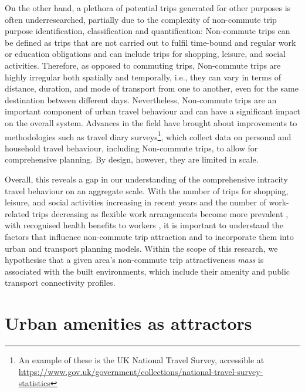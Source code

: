 On the other hand, a plethora of potential trips generated for other purposes is often underresearched, partially due to the complexity of non-commute trip purpose identification, classification and quantification: Non-commute trips can be defined as trips that are not carried out to fulfil time-bound and regular work or education obligations and can include trips for shopping, leisure, and social activities. Therefore, as opposed to commuting trips, Non-commute trips are highly irregular both spatially and temporally, i.e., they can vary in terms of distance, duration, and mode of transport from one to another, even for the same destination between different days. Nevertheless, Non-commute trips are an important component of urban travel behaviour and can have a significant impact on the overall system. Advances in the field have brought about improvements to methodologies such as travel diary surveys\footnote{An example of these is the UK National Travel Survey, accessible at \url{https://www.gov.uk/government/collections/national-travel-survey-statistics}}, which collect data on personal and household travel behaviour, including Non-commute trips, to allow for comprehensive planning. By design, however, they are limited in scale.

Overall, this reveals a gap in our understanding of the comprehensive intracity travel behaviour on an aggregate scale. With the number of trips for shopping, leisure, and social activities increasing in recent years and the number of work-related trips decreasing as flexible work arrangements become more prevalent \citep{wohnerWorkFlexiblyTravel2022}, with recognised health benefits to workers \citep{macleodCommutingWorkPostpandemic2022}, it is important to understand the factors that influence non-commute trip attraction and to incorporate them into urban and transport planning models. Within the scope of this research, we hypothesise that a given area's non-commute trip attractiveness \textit{mass} is associated with the built environments, which include their amenity and public transport connectivity profiles. 

\section{Urban amenities as attractors}

